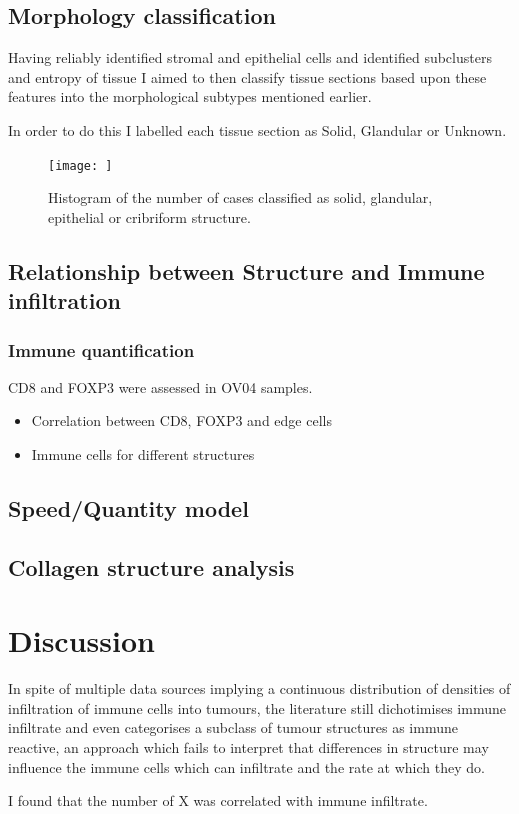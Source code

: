 \subsection{Morphology classification}
Having reliably identified stromal and epithelial cells and identified subclusters and entropy of tissue I aimed to then classify tissue sections based upon these features into the morphological subtypes mentioned earlier.

In order to do this I labelled each tissue section as Solid, Glandular or Unknown.
\begin{figure}
    \centering
    \texttt{[image: ]}
    \caption{Histogram of the number of cases classified as solid, glandular, epithelial  or cribriform structure.}
    \label{fig:num_classl}
\end{figure}

\subsection{Relationship between Structure and Immune infiltration}

\subsubsection{Immune quantification}

CD8 and FOXP3 were assessed in OV04 samples.
\begin{itemize}
    \item Correlation between CD8, FOXP3 and edge cells
    \item Immune cells for different structures
\end{itemize}

\subsection{Speed/Quantity model}

\subsection{Collagen structure analysis}

\section{Discussion}


In spite of multiple data sources implying a continuous distribution of densities of infiltration of immune cells into tumours, the literature still dichotimises immune infiltrate and even categorises a subclass of tumour structures as immune reactive, an approach which fails to interpret that differences in structure may influence the immune cells which can infiltrate and the rate at which they do.

I found that the number of X was correlated with immune infiltrate. 

